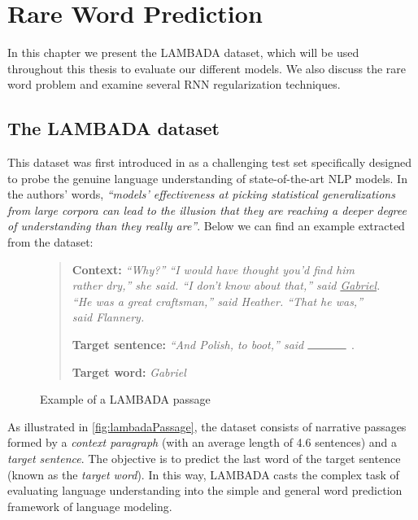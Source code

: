 \chapter{Rare Word Prediction}

In this chapter we present the LAMBADA dataset, which will be used throughout this thesis to evaluate our different models. We also discuss the rare word problem and examine several RNN regularization techniques.

\section{The LAMBADA dataset}
\label{sec:lambada}

This dataset was first introduced in \cite{paperno2016lambada} as a challenging test set specifically designed to probe the genuine language understanding of state-of-the-art NLP models. In the authors' words, \textit{``models' effectiveness at picking statistical generalizations from large corpora can lead to the illusion that they are reaching a deeper degree of understanding than they really are''}. Below we can find an example extracted from the dataset:

\begin{figure}[H]
	\begin{mdframed}[linewidth=1pt]
	\begin{quote} 		
		\textbf{Context:} \textit{``Why?'' ``I would have thought you'd find him rather dry,'' she said. ``I don’t know about that,'' said \underline{Gabriel}. ``He was a great craftsman,'' said Heather. ``That he was,'' said Flannery.} \par
		\textbf{Target sentence:} \textit{``And Polish, to boot,'' said $\rule{1.2cm}{0.15mm}$} . \par
		\textbf{Target word:} \textit{Gabriel}
	\end{quote}
	\end{mdframed}
	\caption{Example of a LAMBADA passage} \label{fig:lambadaPassage}
\end{figure}

As illustrated in \autoref{fig:lambadaPassage}, the dataset consists of narrative passages formed by a \textit{context paragraph} (with an average length of 4.6 sentences) and a \textit{target sentence}. The objective is to predict the last word of the target sentence (known as the \textit{target word}). In this way, LAMBADA casts the complex task of evaluating language understanding into the simple and general word prediction framework of language modeling.

